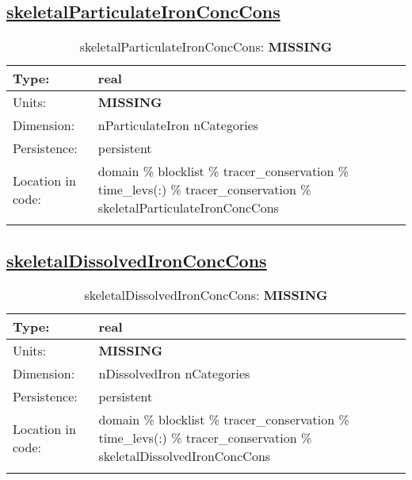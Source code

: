 \subsection[skeletalParticulateIronConcCons]{\hyperref[sec:var_tab_tracer_conservation]{skeletalParticulateIronConcCons}}
\label{subsec:var_sec_tracer_conservation_skeletalParticulateIronConcCons}
\begin{center}
\begin{longtable}{| p{2.0in} | p{4.0in} |}
        \hline 
        Type: & real \\
        \hline 
        Units: & {\bf \color{red} MISSING} \\
        \hline 
        Dimension: & nParticulateIron nCategories \\
        \hline 
        Persistence: & persistent \\
        \hline 
         Location in code: & domain \% blocklist \% tracer\_conservation \% time\_levs(:) \% tracer\_conservation \% skeletalParticulateIronConcCons \\
         \hline 
    \caption{skeletalParticulateIronConcCons: {\bf \color{red} MISSING}}
\end{longtable}
\end{center}
\subsection[skeletalDissolvedIronConcCons]{\hyperref[sec:var_tab_tracer_conservation]{skeletalDissolvedIronConcCons}}
\label{subsec:var_sec_tracer_conservation_skeletalDissolvedIronConcCons}
\begin{center}
\begin{longtable}{| p{2.0in} | p{4.0in} |}
        \hline 
        Type: & real \\
        \hline 
        Units: & {\bf \color{red} MISSING} \\
        \hline 
        Dimension: & nDissolvedIron nCategories \\
        \hline 
        Persistence: & persistent \\
        \hline 
         Location in code: & domain \% blocklist \% tracer\_conservation \% time\_levs(:) \% tracer\_conservation \% skeletalDissolvedIronConcCons \\
         \hline 
    \caption{skeletalDissolvedIronConcCons: {\bf \color{red} MISSING}}
\end{longtable}
\end{center}
